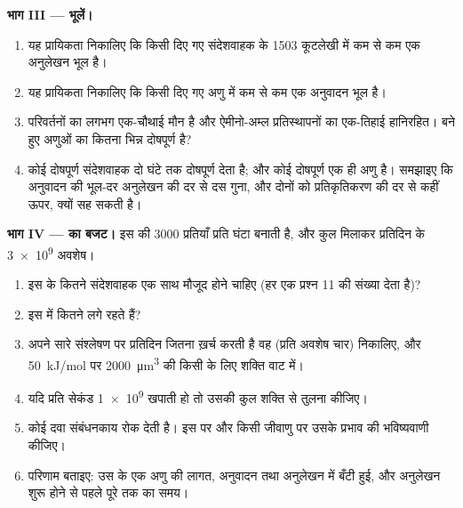 \begin{problem}
\medskip
\noindent\textbf{भाग III --- भूलें।}
\begin{enumerate}[resume]
  \item यह प्रायिकता निकालिए कि किसी दिए गए संदेशवाहक के \qty{1503}{}
        कूटलेखी  में कम से कम एक अनुलेखन भूल है।
  \item यह प्रायिकता निकालिए कि किसी दिए गए  अणु में कम से कम एक
        अनुवादन भूल है।
  \item {} परिवर्तनों का लगभग एक-चौथाई मौन है और ऐमीनो-अम्ल
        प्रतिस्थापनों का एक-तिहाई हानिरहित। बने हुए  अणुओं का
        कितना भिन्न दोषपूर्ण है?
  \item कोई दोषपूर्ण संदेशवाहक दो घंटे तक दोषपूर्ण  देता है; और
        कोई दोषपूर्ण  एक ही अणु है। समझाइए कि  अनुवादन की
        भूल-दर अनुलेखन की दर से दस गुना, और दोनों को प्रतिकृतिकरण की दर
        से कहीं ऊपर, क्यों सह सकती है।
\end{enumerate}

\medskip
\noindent\textbf{भाग IV ---  का बजट।}
 इस  की \num{3000} प्रतियाँ प्रति घंटा बनाती है, और कुल
मिलाकर प्रतिदिन  के \num{3e9} अवशेष।
\begin{enumerate}[resume]
  \item इस  के कितने संदेशवाहक एक साथ मौजूद होने चाहिए
        (हर एक प्रश्न 11 की संख्या देता है)?
  \item इस  में कितने  लगे रहते हैं?
  \item {} अपने सारे  संश्लेषण पर प्रतिदिन जितना  ख़र्च
        करती है वह (प्रति अवशेष चार) निकालिए, और \qty{50}{kJ/mol} पर
        \qty{2000}{\micro m^3} की किसी  के लिए शक्ति वाट में।
  \item यदि  प्रति सेकंड \qty{1e9}{}  खपाती हो तो उसकी कुल
        शक्ति से तुलना कीजिए।
  \item कोई दवा संबंधनकाय रोक देती है। इस  पर और किसी जीवाणु
         पर उसके प्रभाव की भविष्यवाणी कीजिए।
  \item परिणाम बताइए: उस  के एक अणु की  लागत, अनुवादन तथा
        अनुलेखन में बँटी हुई, और अनुलेखन शुरू होने से पहले पूरे 
        तक का समय।
\end{enumerate}
\end{problem}
